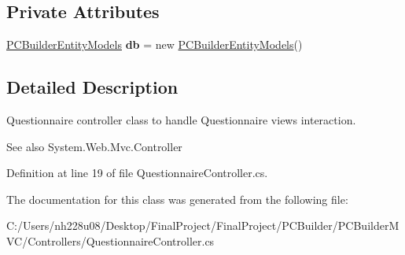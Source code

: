 \subsection*{Private Attributes}
\begin{DoxyCompactItemize}
\item 
\hyperlink{class_p_c_builder_m_v_c_1_1_models_1_1_p_c_builder_entity_models}{P\+C\+Builder\+Entity\+Models} {\bfseries db} = new \hyperlink{class_p_c_builder_m_v_c_1_1_models_1_1_p_c_builder_entity_models}{P\+C\+Builder\+Entity\+Models}()\hypertarget{class_p_c_builder_m_v_c_1_1_controllers_1_1_questionnaire_controller_a664b66f071710f84457bd129929b6777}{}\label{class_p_c_builder_m_v_c_1_1_controllers_1_1_questionnaire_controller_a664b66f071710f84457bd129929b6777}

\end{DoxyCompactItemize}


\subsection{Detailed Description}
Questionnaire controller class to handle Questionnaire views interaction. 

\begin{DoxySeeAlso}{See also}
System.\+Web.\+Mvc.\+Controller


\end{DoxySeeAlso}


Definition at line 19 of file Questionnaire\+Controller.\+cs.



The documentation for this class was generated from the following file\+:\begin{DoxyCompactItemize}
\item 
C\+:/\+Users/nh228u08/\+Desktop/\+Final\+Project/\+Final\+Project/\+P\+C\+Builder/\+P\+C\+Builder\+M\+V\+C/\+Controllers/Questionnaire\+Controller.\+cs\end{DoxyCompactItemize}
